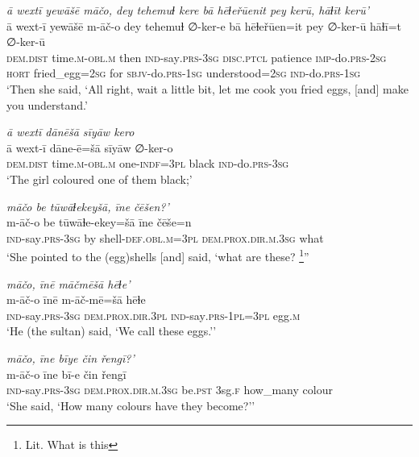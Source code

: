 \ea \label{ŽH.79}
\textit{ā wextī yewāšē māčo, dey tehemuɫ kere bā hēɫeřūenit pey kerū, hāɫīt kerū'} \\ 
\gll ā wext-ī yewāšē m-āč-o dey tehemuɫ ∅-ker-e bā hēɫeřūen=it pey ∅-ker-ū hāɫī=t ∅-ker-ū \\ 
 \textsc{dem.dist} time\textsc{.m}\textsc{-obl}\textsc{.m} then \textsc{ind-}say\textsc{.prs}\textsc{-3sg} \textsc{disc.ptcl} patience \textsc{imp-}do\textsc{.prs}-\textsc{2sg} \textsc{hort} fried\_egg\textsc{=\textsc{2sg}} for \textsc{sbjv-}do\textsc{.prs}\textsc{-1sg} understood\textsc{=\textsc{2sg}} \textsc{ind-}do\textsc{.prs}\textsc{-1sg} \\ 
\glt `Then she said, ‘All right, wait a little bit, let me cook you fried eggs, [and] make you understand.'
\z 
 
\ea \label{ŽH.83}
\textit{ā wextī dānēšā sīyāw kero} \\ 
\gll ā wext-ī dāne-ē=šā sīyāw ∅-ker-o \\ 
 \textsc{dem.dist} time\textsc{.m}\textsc{-obl}\textsc{.m} one\textsc{-indf}\textsc{=3pl} black \textsc{ind-}do\textsc{.prs}\textsc{-3sg} \\ 
\glt `The girl coloured one of them black;'
\z 
 
\ea \label{ŽH.86}
\textit{māčo be tūwāɫekeyšā, īne čēšen?’} \\ 
\gll m-āč-o be tūwāɫe-ekey=šā īne čēše=n \\ 
 \textsc{ind-}say\textsc{.prs}\textsc{-3sg} by shell\textsc{-def}\textsc{.obl}\textsc{.m}\textsc{=3pl} \textsc{dem.prox}\textsc{.dir}\textsc{.m}\textsc{.3sg} what \\ 
\glt `She pointed to the (egg)shells [and] said, ‘what are these? \footnote{Lit. What is this}''
\z 
 
\ea \label{ŽH.87}
\textit{māčo, īnē māčmēšā hēɫe’} \\ 
\gll m-āč-o īnē m-āč-mē=šā hēɫe \\ 
 \textsc{ind-}say\textsc{.prs}\textsc{-3sg} \textsc{dem.prox}\textsc{.dir}\textsc{.3pl} \textsc{ind-}say\textsc{.prs}\textsc{-1pl}\textsc{=3pl} egg\textsc{.m} \\ 
\glt `He (the sultan) said, ‘We call these eggs.’'
\z 
 
\ea \label{ŽH.88}
\textit{māčo, īne bīye čin řengī?’} \\ 
\gll m-āč-o īne bī-e čin řengī \\ 
 \textsc{ind-}say\textsc{.prs}\textsc{-3sg} \textsc{dem.prox}\textsc{.dir}\textsc{.m}\textsc{.3sg} be\textsc{.pst} 3sg\textsc{\textsc{.f}} how\_many colour \\ 
\glt `She said, ‘How many colours have they become?’'
\z 
 
